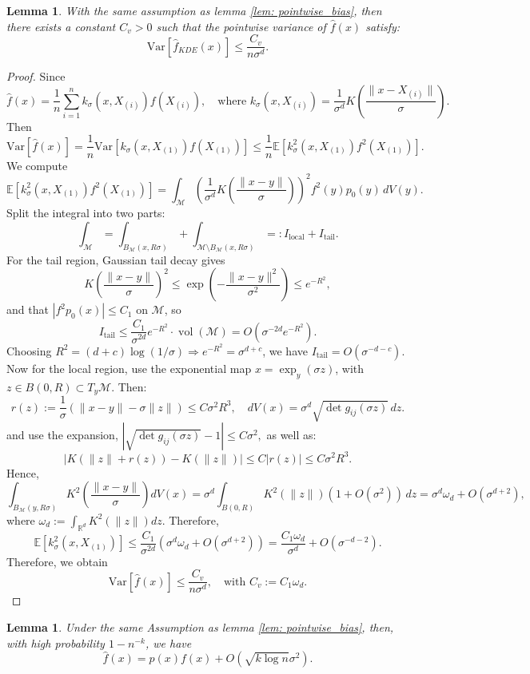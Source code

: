 \documentclass{article}
\newtheorem{lemma}[theorem]{Lemma}
\begin{document}
\begin{lemma}
\label{lem:pointwise_variance}
   With the same assumption as lemma \ref{lem: pointwise_bias}, then there exists a constant \( C_v > 0 \) such that the pointwise variance of \(\hat{f}(x)\) satisfy:
\[
 \mathrm{Var}[\hat{f}_{KDE}(x)]  \leq \frac{C_v}{n \sigma^d}.
\]
\end{lemma}

\begin{proof}
Since
\[
\hat{f}(x) = \frac{1}{n} \sum_{i=1}^n k_\sigma(x, X_{(i)})f(X_{(i)}),
  \quad \text{where } 
k_\sigma(x, X_{(i)}) = \frac{1}{\sigma^d} K\left( \frac{\|x-X_{(i)}\|}{\sigma} \right).
\]
Then
\[
\mathrm{Var}[\hat{f}(x)] = \frac{1}{n} \mathrm{Var}[k_\sigma(x, X_{(1)})f(X_{(1)})] \le \frac{1}{n} \mathbb{E}[k_\sigma^2(x, X_{(1)}){f^2(X_{(1)})}].
\]
We compute
\[
\mathbb{E}[k_\sigma^2(x, X_{(1)})f^2(X_{(1)})] = \int_{\mathcal{M}} \left( \frac{1}{\sigma^d} K\left( \frac{\|x-y\|}{\sigma} \right) \right)^2 f^2(y)p_0(y) \, dV(y).
\]
Split the integral into two parts:
\[
\int_{\mathcal{M}} = \int_{B_{\mathcal{M}}(x, R\sigma)} + \int_{\mathcal{M} \setminus B_{\mathcal{M}}(x, R\sigma)} =: I_{\text{local}} + I_{\text{tail}}.
\]
For the tail region, Gaussian tail decay gives
\[
K\left( \frac{\|x-y\|}{\sigma} \right)^2 \le \exp\left( -\frac{\|x-y\|^2}{\sigma^2} \right) \le e^{-R^2},
\]
and that \(|f^2p_0(x)| \le C_1\) on \(\mathcal{M}\), so
\[
I_{\text{tail}} \le \frac{C_1}{\sigma^{2d}} e^{-R^2} \cdot \operatorname{vol}(\mathcal{M}) = O(\sigma^{-2d} e^{-R^2}).
\]
Choosing \( R^2 = (d + c) \log(1/\sigma) \Rightarrow e^{-R^2} = \sigma^{d + c} \), we have $I_{\text{tail}} = O(\sigma^{-d - c}).$
Now for the local region, use the exponential map \( x = \exp_y(\sigma z) \), with \( z \in B(0,R) \subset T_y \mathcal{M} \). Then:
\[
r(z):=\frac{1}{\sigma}(\|x-y\| -\sigma \|z\|)\leq C\sigma^2 R^3, \quad  dV(x) = \sigma^d \sqrt{\det g_{ij}(\sigma z)} \, dz.
\]
and use the expansion,
$|\sqrt{\det g_{ij}(\sigma z)} - 1|\leq C\sigma^2,$
as well as:
\[
|K(\|z\|+r(z))-K(\|z\|)|\leq C |r(z)|\leq C\sigma^2R^3.
\]
Hence,
\[
\int_{B_{\mathcal{M}}(y,R\sigma)} K^2\left( \frac{\|x-y\|}{\sigma} \right) dV(x)
= \sigma^d \int_{B(0,R)} K^2(\|z\|) (1 + O(\sigma^2)) \, dz = \sigma^d \omega_d + O(\sigma^{d+2}),
\]
where \( \omega_d := \int_{\mathbb{R}^d} K^2(\|z\|) dz \). Therefore,
\[
\mathbb{E}[k_\sigma^2(x, X_{(1)})] \le \frac{C_1}{\sigma^{2d}} (\sigma^d \omega_d + O(\sigma^{d+2})) = \frac{C_1 \omega_d}{\sigma^d} + O(\sigma^{-d-2}).
\]
Therefore, we obtain
\[
\mathrm{Var}[\hat{f}(x)]  \leq \frac{C_v}{n \sigma^d},
\quad \text{with } C_v := C_1 \omega_d.
\]
\end{proof}
\begin{lemma}
\label{lem:denominator_F}
Under the same Assumption as lemma \ref{lem: pointwise_bias},
then, with high probability \(1-n^{-k}\), we have
\[
\widehat{f}(x) = p(x)f(x) + O(\sqrt{k\log n}\sigma^2).
\]
\end{lemma}
\end{document}
